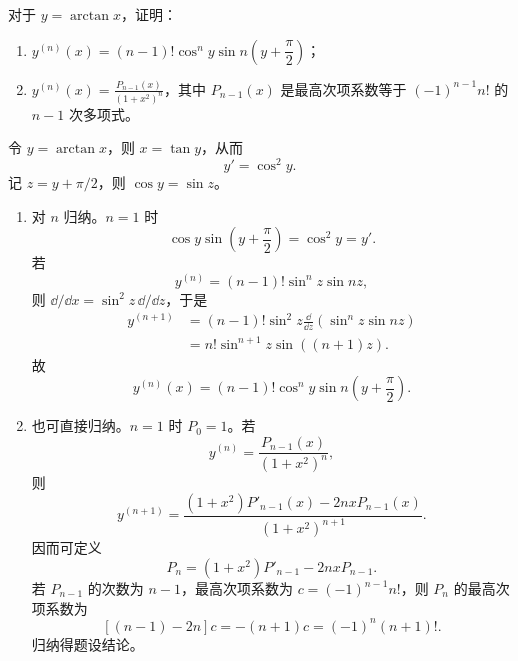 \begin{xreferenceproblem}[19]
对于 $y=\arctan x$，证明：
  \begin{enumerate}[label=(\arabic*)]
    \item $y^{(n)}(x)=(n-1)!\cos^n y\sin n\left(y+\dfrac\pi2\right)$；
    \item $\displaystyle y^{(n)}(x)=\frac{P_{n-1}(x)}{(1+x^2)^n}$，其中 $P_{n-1}(x)$ 是最高次项系数等于 $(-1)^{n-1}n!$ 的 $n-1$ 次多项式。
  \end{enumerate}
\end{xreferenceproblem}
\begin{xsolution}
令 $y=\arctan x$，则 $x=\tan y$，从而
\[
  y'=\cos^2y.
\]
记 $z=y+\pi/2$，则 $\cos y=\sin z$。

\begin{enumerate}[label=(\arabic*)]
  \item 对 $n$ 归纳。$n=1$ 时
  \[
    \cos y\sin\left(y+\frac\pi2\right)=\cos^2y=y'.
  \]
  若
  \[
    y^{(n)}=(n-1)!\sin^nz\sin nz,
  \]
  则 $\dd/\dd x=\sin^2z\,\dd/\dd z$，于是
  \begin{align*}
    y^{(n+1)}
    &=(n-1)!\sin^2z\frac{\dd}{\dd z}(\sin^nz\sin nz)\\
    &=n!\sin^{n+1}z\sin((n+1)z).
  \end{align*}
  故
  \[
    \boxed{y^{(n)}(x)=(n-1)!\cos^ny\sin n\left(y+\frac\pi2\right)}.
  \]

  \item 也可直接归纳。$n=1$ 时 $P_0=1$。若
  \[
    y^{(n)}=\frac{P_{n-1}(x)}{(1+x^2)^n},
  \]
  则
  \[
    y^{(n+1)}=
    \frac{(1+x^2)P'_{n-1}(x)-2nxP_{n-1}(x)}{(1+x^2)^{n+1}}.
  \]
  因而可定义
  \[
    P_n=(1+x^2)P'_{n-1}-2nxP_{n-1}.
  \]
  若 $P_{n-1}$ 的次数为 $n-1$，最高次项系数为 $c=(-1)^{n-1}n!$，则 $P_n$ 的最高次项系数为
  \[
    [(n-1)-2n]c=-(n+1)c=(-1)^n(n+1)!.
  \]
  归纳得题设结论。
\end{enumerate}
\end{xsolution}


